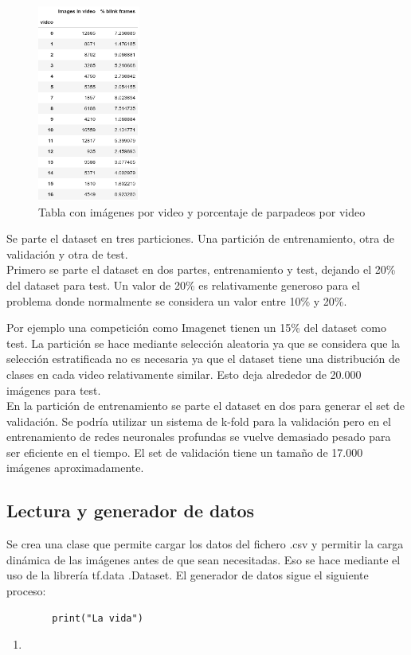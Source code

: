\documentclass[12pt]{article}
\begin{document}
    \begin{figure} %
        \centering
        \includegraphics[width=0.3\textwidth]{drtA5y}
        \caption{Tabla con imágenes por video y porcentaje de parpadeos por video}
    \end{figure}

    Se parte el dataset en tres particiones.
    Una partición de entrenamiento, otra de validación y otra de test.\\
    Primero se parte el dataset en dos partes, entrenamiento y test, dejando el 20\% del dataset para test.
    Un valor de 20\% es relativamente generoso para el problema donde normalmente se considera un valor entre 10\% y
    20\%.

    Por ejemplo una competición como Imagenet tienen un 15\% del dataset como test\cite{imageNet}.
    La partición se hace mediante selección aleatoria ya que se considera que la selección estratificada no es
    necesaria ya que el dataset tiene una distribución de clases en cada video relativamente similar.
    Esto deja alrededor de 20.000 imágenes para test.\\
    En la partición de entrenamiento se parte el dataset en dos para generar el set de validación.
    Se podría utilizar un sistema de k-fold para la validación pero en el entrenamiento de redes neuronales
    profundas se vuelve demasiado pesado para ser eficiente en el tiempo. El set de validación tiene
    un tamaño de 17.000 imágenes aproximadamente.

    \subsection*{Lectura y generador de datos}
    Se crea una clase que permite cargar los datos del fichero .csv y permitir la carga dinámica de las
    imágenes antes de que sean necesitadas. Eso se hace mediante el uso de la librería tf.data
    .Dataset\cite{tfdata_dataset}.
    El generador de datos sigue el siguiente proceso:
    \begin{verbatim}
        print("La vida")
    \end{verbatim}
    \begin{enumerate}
        \item
    \end{enumerate}
\end{document}
